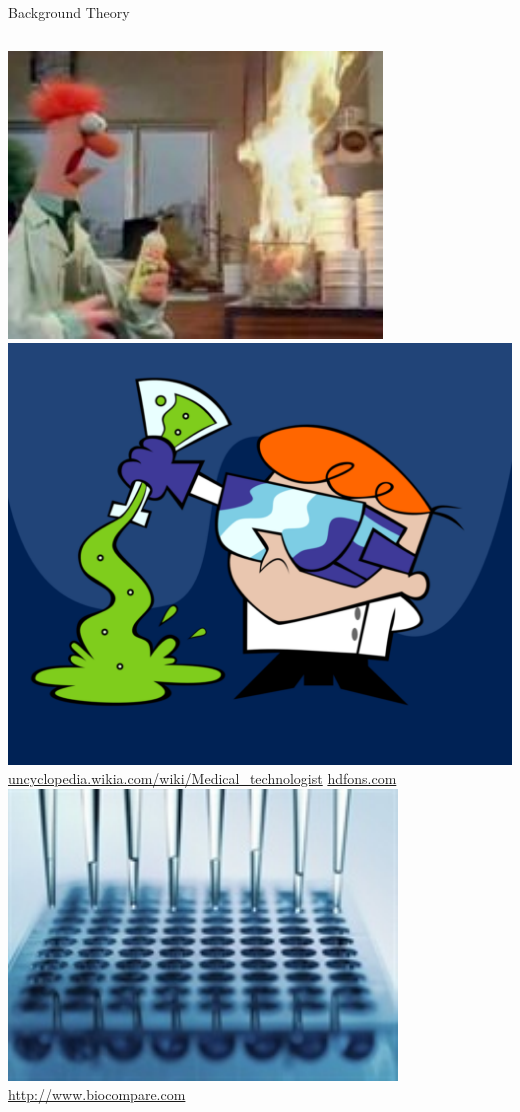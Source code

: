 \documentclass[letter,graphicx]{beamer}
\def\Tiny{\fontsize{3pt}{3pt} \selectfont}
\begin{document}
\begin{frame}{Background Theory}
\begin{columns}[c]
\column{2.5in}
\centering \includegraphics[width=.45\textwidth]{images/bad_lab} \hspace{2mm}
\includegraphics[width=.45\textwidth]{images/bad_lab2} \\
\Tiny \hspace{.5mm} \url{uncyclopedia.wikia.com/wiki/Medical_technologist} \hspace{12mm} \url{hdfons.com} \hfill
\vspace{5mm}
\centering \includegraphics[width=.6\textwidth]{images/pipette} \\
\Tiny \url{http://www.biocompare.com}

\end{columns}
\end{frame}
\end{document}
